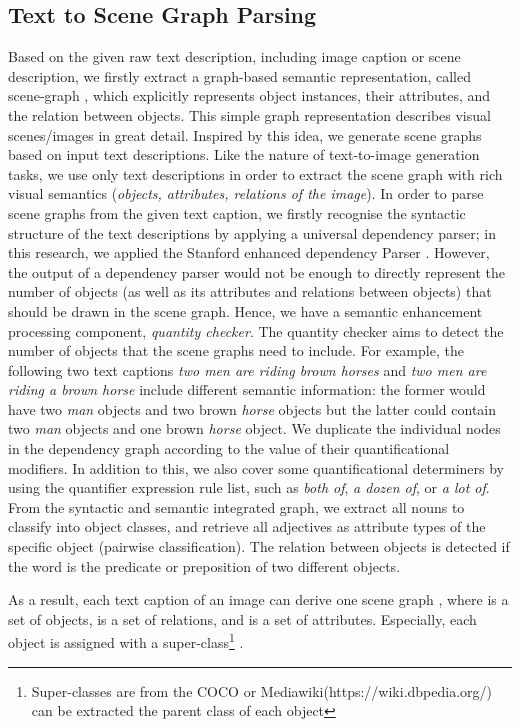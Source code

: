 \documentclass[11pt]{article}
\begin{document}
\subsection{Text to Scene Graph Parsing}
Based on the given raw text description, including image caption or scene description, we firstly extract a graph-based semantic representation, called scene-graph \cite{johnson2015image}, which explicitly represents object instances, their attributes, and the relation between objects. This simple graph representation describes visual scenes/images in great detail. Inspired by this idea, we generate scene graphs based on input text descriptions. Like the nature of text-to-image generation tasks, we use only text descriptions in order to extract the scene graph with rich visual semantics (\textit{objects, attributes, relations of the image}). In order to parse scene graphs from the given text caption, we firstly recognise the syntactic structure of the text descriptions by applying a universal dependency parser; in this research, we applied the Stanford enhanced dependency Parser \cite{chen-manning-2014-fast}. However, the output of a dependency parser would not be enough to directly represent the number of objects (as well as its attributes and relations between objects) that should be drawn in the scene graph. Hence, we have a semantic enhancement processing component, \textit{quantity checker}. The quantity checker aims to detect the number of objects that the scene graphs need to include. For example, the following two text captions \textit{two men are riding brown horses} and \textit{two men are riding a brown horse} include different semantic information: the former would have two \textit{man} objects and two brown \textit{horse} objects but the latter could contain two \textit{man} objects and one brown \textit{horse} object. We duplicate the individual nodes in the dependency graph according to the value of their quantificational modifiers. In addition to this, we also cover some quantificational determiners by using the quantifier expression rule list, such as \textit{both of},  \textit{a dozen of}, or \textit{a lot of}. From the  syntactic and semantic integrated graph, we extract all nouns to classify into object classes, and retrieve all adjectives as attribute types of the specific object (pairwise classification). The relation between objects is detected if the word is the predicate or preposition of two different objects. 


As a result, each text caption of an image can derive one scene graph , where  is a set of objects,  is a set of relations, and  is a set of attributes.  Especially, each object  is assigned with a super-class\footnote{Super-classes are from the COCO or Mediawiki(https://wiki.dbpedia.org/) can be extracted the parent class of each object} . 
\end{document}
